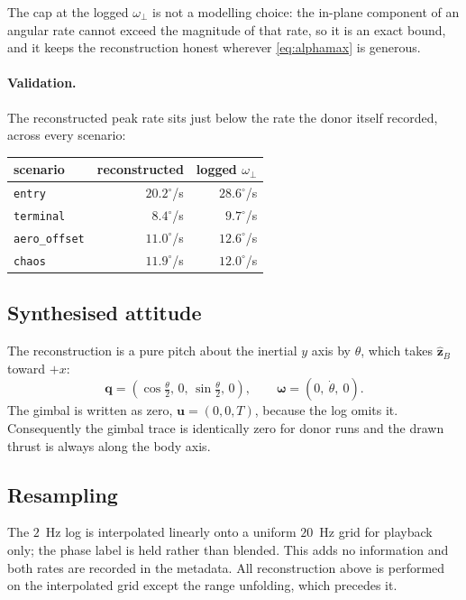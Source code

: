 \documentclass[11pt,a4paper]{article}
\newcommand{\vect}[1]{\mathbf{#1}}
\newcommand{\quat}[1]{\mathbf{#1}}
\newcommand{\code}[1]{\texttt{#1}}
\begin{document}
The cap at the logged $\omega_\perp$ is not a modelling choice: the in-plane
component of an angular rate cannot exceed the magnitude of that rate, so it is
an exact bound, and it keeps the reconstruction honest wherever
\eqref{eq:alphamax} is generous.

\paragraph{Validation.} The reconstructed peak rate sits just below the rate the
donor itself recorded, across every scenario:

\begin{center}
\begin{tabular}{lrr}
\toprule
scenario & reconstructed & logged $\omega_\perp$ \\
\midrule
\code{entry}       & $20.2^\circ$/s & $28.6^\circ$/s \\
\code{terminal}    & $8.4^\circ$/s  & $9.7^\circ$/s  \\
\code{aero\_offset}& $11.0^\circ$/s & $12.6^\circ$/s \\
\code{chaos}       & $11.9^\circ$/s & $12.0^\circ$/s \\
\bottomrule
\end{tabular}
\end{center}

\subsection{Synthesised attitude}

The reconstruction is a pure pitch about the inertial $y$ axis by $\theta$,
which takes $\hat{\vect{z}}_B$ toward $+x$:
\begin{equation}
\quat{q} = \left(\cos\tfrac{\theta}{2},\,0,\,\sin\tfrac{\theta}{2},\,0\right),
\qquad
\boldsymbol{\omega} = \left(0,\ \dot\theta,\ 0\right).
\end{equation}
The gimbal is written as zero, $\vect{u}=(0,0,T)$, because the log omits it.
Consequently the gimbal trace is identically zero for donor runs and the drawn
thrust is always along the body axis.

\subsection{Resampling}

The $2$~Hz log is interpolated linearly onto a uniform $20$~Hz grid for playback
only; the phase label is held rather than blended. This adds no information and
both rates are recorded in the metadata. All reconstruction above is performed on
the interpolated grid except the range unfolding, which precedes it.
\end{document}
